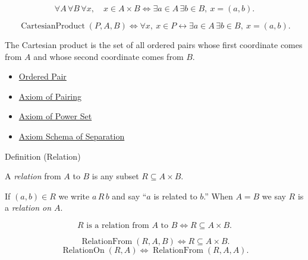 \begin{remark*}
\[
  \forall A\,\forall B\,\forall x,\quad
  x\in A\times B
  \iff
  \exists a\in A\,\exists b\in B,\ x=(a,b).
\]
\end{remark*}

\begin{remark*}
\[
  \operatorname{CartesianProduct}(P,A,B)
  \iff
  \forall x,\ x\in P \leftrightarrow
  \exists a\in A\,\exists b\in B,\ x=(a,b).
\]
\end{remark*}

\begin{remark*}[Interpretation]
The Cartesian product is the set of all ordered pairs whose first coordinate
comes from $A$ and whose second coordinate comes from $B$.
\end{remark*}

\begin{dependencies}
\begin{itemize}
  \item \hyperref[def:ordered-pair]{Ordered Pair}
  \item \hyperref[ax:pairing]{Axiom of Pairing}
  \item \hyperref[ax:power-set]{Axiom of Power Set}
  \item \hyperref[ax:separation]{Axiom Schema of Separation}
\end{itemize}
\end{dependencies}

\begin{definitionbox}{Definition (Relation)}
\begin{definition}[Relation]\label{def:relation}
A \emph{relation} from $A$ to $B$ is any subset $R \subseteq A \times B$.

If $(a,b) \in R$ we write $a \, R \, b$ and say ``$a$ is related to $b$.''
When $A = B$ we say $R$ is a \emph{relation on $A$}.
\end{definition}
\end{definitionbox}

\begin{remark*}
\[
  R \text{ is a relation from } A \text{ to } B
  \iff
  R\subseteq A\times B.
\]
\end{remark*}

\begin{remark*}
\[
  \operatorname{RelationFrom}(R,A,B)
  \iff
  R\subseteq A\times B.
\]
\[
  \operatorname{RelationOn}(R,A)
  \iff
  \operatorname{RelationFrom}(R,A,A).
\]
\end{remark*}

